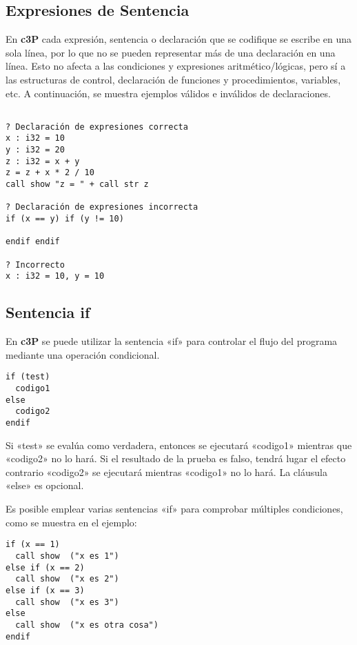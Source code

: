 \subsection{Expresiones de Sentencia}

En \textbf{c3P} cada expresión, sentencia o declaración que se codifique se escribe en una sola
línea, por lo que no se pueden representar más de una declaración en una línea. Esto
no afecta a las condiciones y expresiones aritmético/lógicas, pero sí a las estructuras
de control, declaración de funciones y procedimientos, variables, etc. A continuación,
se muestra ejemplos válidos e inválidos de declaraciones.

\begin{verbatim}

? Declaración de expresiones correcta
x : i32 = 10
y : i32 = 20
z : i32 = x + y
z = z + x * 2 / 10
call show "z = " + call str z

? Declaración de expresiones incorrecta
if (x == y) if (y != 10)

endif endif

? Incorrecto
x : i32 = 10, y = 10
\end{verbatim}

\subsection{Sentencia if}

En \textbf{c3P} se puede utilizar la sentencia «if» para controlar el flujo del programa mediante una operación condicional.

\begin{verbatim}
if (test)
  codigo1
else
  codigo2
endif
\end{verbatim}

Si «test» se evalúa como verdadera, entonces se ejecutará «codigo1» mientras que «codigo2» no lo hará. Si el resultado de la prueba es falso, tendrá lugar el efecto contrario «codigo2» se ejecutará mientras «codigo1» no lo hará. La cláusula «else» es opcional. 

Es posible emplear varias sentencias «if» para comprobar múltiples condiciones, como se muestra en el ejemplo:

\begin{verbatim}
if (x == 1)
  call show  ("x es 1")
else if (x == 2)
  call show  ("x es 2")
else if (x == 3)
  call show  ("x es 3")
else
  call show  ("x es otra cosa")
endif
\end{verbatim}

